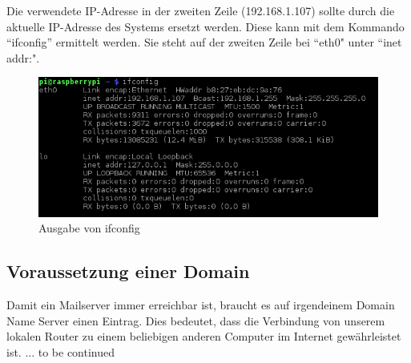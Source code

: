 Die verwendete IP-Adresse in der zweiten Zeile (192.168.1.107) sollte durch die aktuelle IP-Adresse des Systems ersetzt werden. Diese kann mit dem Kommando ``ifconfig'' ermittelt werden. Sie steht auf der zweiten Zeile bei ``eth0" unter ``inet addr:".

\begin{figure}[h]
\centering
\includegraphics[scale=0.65]{images/ifconfig}
\caption{Ausgabe von ifconfig}
\end{figure}

\subsection{Voraussetzung einer Domain}
Damit ein Mailserver immer erreichbar ist, braucht es auf irgendeinem Domain Name Server einen Eintrag. Dies bedeutet, dass die Verbindung von unserem lokalen Router zu einem beliebigen anderen Computer im Internet gewährleistet ist.
... to be continued






